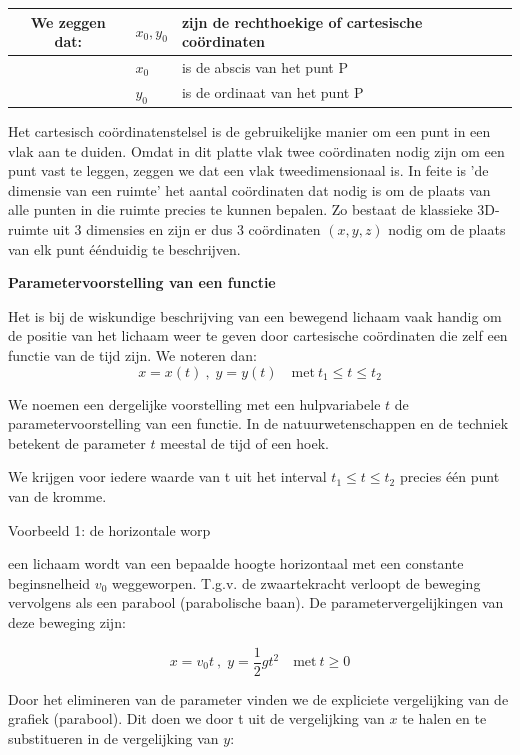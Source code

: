 \begin{table}
	\centering
\begin{tabular}{|c|l|l|}
	\hline 
	We zeggen dat: & $x_{0},y_{0}$  & zijn de rechthoekige of cartesische co\"ordinaten\\
	\hline 
	& $x_{0}$  & is de abscis van het punt P\\
	\hline 
	& $y_{0}$ & is de ordinaat van het punt P\\
	\hline 
\end{tabular}
\end{table}


\noindent Het cartesisch co\"ordinatenstelsel is de gebruikelijke manier
om een punt in een vlak aan te duiden. Omdat in dit platte vlak twee
co\"ordinaten nodig zijn om een punt vast te leggen, zeggen we dat een
vlak tweedimensionaal is. In feite is 'de dimensie van een ruimte'
het aantal co\"ordinaten dat nodig is om de plaats van alle punten in
die ruimte precies te kunnen bepalen. Zo bestaat de klassieke 3D-ruimte
uit 3 dimensies en zijn er dus 3 co\"ordinaten $(x,y,z)$ nodig om de
plaats van elk punt \'e\'enduidig te beschrijven. 

\textbf{Parametervoorstelling van een functie}

\noindent Het is bij de wiskundige beschrijving van een bewegend lichaam
vaak handig om de positie van het lichaam weer te geven door cartesische
co\"ordinaten die zelf een functie van de tijd zijn. We noteren dan:
\[
x=x(t)\:,\;y=y(t)\quad\textrm{met}\:t_{1}\leq t\leq t_{2}
\]

\noindent We noemen een dergelijke voorstelling met een hulpvariabele
$t$ de parametervoorstelling van een functie. In de natuurwetenschappen
en de techniek betekent de parameter $t$ meestal de tijd of een hoek.

\noindent We krijgen voor iedere waarde van t uit het interval $t_{1}\leq t\leq t_{2}$
precies \'e\'en punt van de kromme.\medskip{}


\noindent Voorbeeld 1: de horizontale worp

\noindent een lichaam wordt van een bepaalde hoogte horizontaal met
een constante beginsnelheid $v_{0}$ weggeworpen. T.g.v. de zwaartekracht
verloopt de beweging vervolgens als een parabool (parabolische baan).
De parametervergelijkingen van deze beweging zijn:

\[
x=v_{0}t\:,\;y=\frac{1}{2}gt^{2}\quad\textrm{met}\:t\geq0
\]


\noindent Door het elimineren van de parameter vinden we de expliciete
vergelijking van de grafiek (parabool). Dit doen we door t uit de
vergelijking van $x$ te halen en te substitueren in de vergelijking
van $y$:

